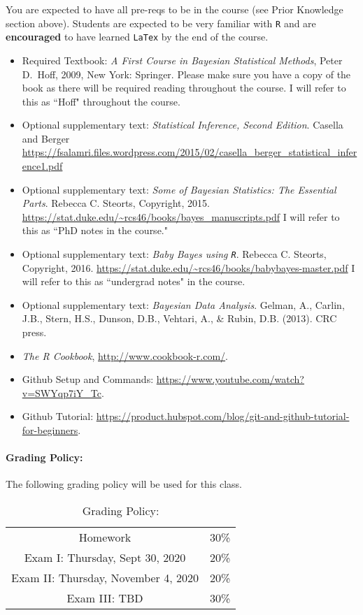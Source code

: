 \documentclass[11pt]{article}
\begin{document}
You are expected to have all pre-reqs to be in the course (see Prior Knowledge section above). Students are expected to be very familiar with \texttt{R} and are \textbf{encouraged} to have learned \texttt{LaTex} by the end of the course. 

\begin{itemize}
\item[] Required Textbook: \textit{A First Course in Bayesian Statistical Methods}, Peter D.\ Hoff, 2009, New York: Springer. Please make sure you have a copy of the book as there will be required reading throughout the course. I will refer to this as ``Hoff" throughout the course. 
\item[] Optional supplementary text:  \textit{Statistical Inference, Second Edition}. Casella and Berger \url{https://fsalamri.files.wordpress.com/2015/02/casella_berger_statistical_inference1.pdf}
\item[] Optional supplementary text:  \textit{Some of Bayesian Statistics: The Essential Parts}. Rebecca C. Steorts, Copyright, 2015. \url{https://stat.duke.edu/~rcs46/books/bayes_manuscripts.pdf} I will refer to this as ``PhD notes in the course."
\item[] Optional supplementary text:  \textit{Baby Bayes using \texttt{R}}. Rebecca C. Steorts, Copyright, 2016. 
\url{https://stat.duke.edu/~rcs46/books/babybayes-master.pdf} I will refer to this as ``undergrad notes" in the course. 
\item[] Optional supplementary text:  \textit{Bayesian Data Analysis}. Gelman, A., Carlin, J.B., Stern, H.S., Dunson, D.B., Vehtari, A., \& Rubin, D.B. (2013). CRC press.
\item[] \emph{The R Cookbook}, \url{http://www.cookbook-r.com/}.
\item[] Github Setup and Commands: \url{https://www.youtube.com/watch?v=SWYqp7iY_Tc}.
\item[] Github Tutorial: \url{https://product.hubspot.com/blog/git-and-github-tutorial-for-beginners}.

\end{itemize}

\paragraph{Grading Policy:} 
The following grading policy will be used for this class. 

\begin{table}[h!]
\caption{Grading Policy:}
\begin{center}
\begin{tabular}{cc}
Homework &30\%\\
Exam I:  Thursday, Sept 30, 2020 &20\%\\
Exam  II: Thursday, November 4, 2020 & 20\%\\
Exam III:  TBD & 30\%\\
\end{tabular}
\end{center}
\label{default}
\end{table}%
\end{document}
